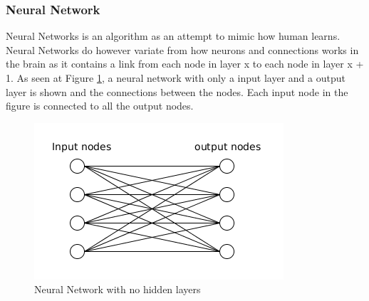 \subsubsection{Neural Network}
Neural Networks is an algorithm as an attempt to mimic how human learns.
Neural Networks do however variate from how neurons and connections works in the brain as it contains a link from each node in layer x to each node in layer x + 1. As seen at Figure \ref{fig:neuralnetwork}, a neural network with only a input layer and a output layer is shown and the connections between the nodes. Each input node in the figure is connected to all the output nodes.

\begin{figure}
  \centering
  \includegraphics[width=0.7\linewidth]{Images/neuralnetwork}
  \caption{Neural Network with no hidden layers}
  \label{fig:neuralnetwork}
\end{figure}

